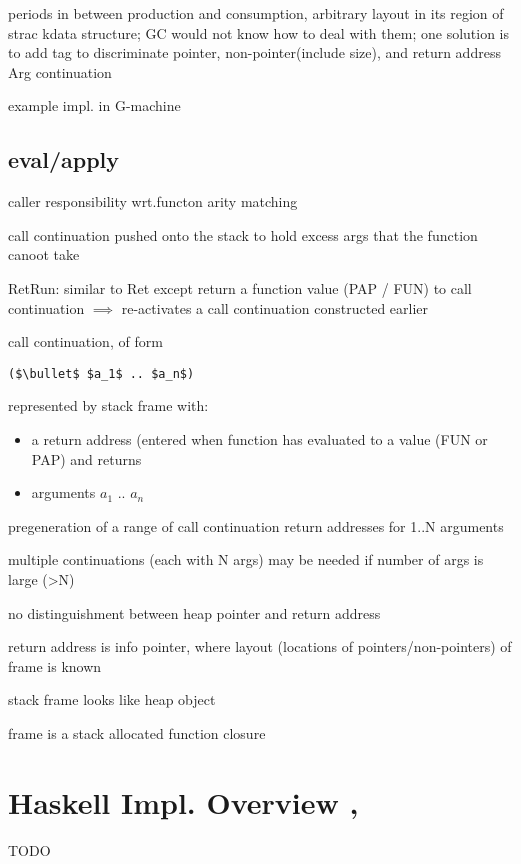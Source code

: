 \documentclass[8pt]{extarticle}
\begin{document}
\begin{multicols*}{2}
periods in between production and consumption, arbitrary layout in its region of strac kdata structure; GC would not know how to deal with them; one solution is to add tag to discriminate pointer, non-pointer(include size), and return address Arg continuation

example impl. in G-machine

\subsection{eval/apply}

caller responsibility wrt.functon arity matching

call continuation pushed onto the stack to hold excess args that the function canoot take

RetRun: similar to Ret except return a function value (PAP / FUN) to call continuation $\implies$ re-activates a call continuation constructed earlier

call continuation, of form
\begin{lstlisting}
($\bullet$ $a_1$ .. $a_n$)
\end{lstlisting}
represented by stack frame with:
\begin{itemize}
\item a return address (entered when function has evaluated to a value (FUN or PAP) and returns
\item arguments $a_1$ .. $a_n$
\end{itemize}

pregeneration of a range of call continuation return addresses for 1..N arguments

multiple continuations (each with N args)  may be needed if number of args is large (>N)

no distinguishment between heap pointer and return address

return address is info pointer, where layout (locations of pointers/non-pointers) of frame is known

stack frame looks like heap object

frame is a stack allocated function closure

\section{Haskell Impl. Overview \cite{wiki_STG}, \cite{terei2011}}

TODO



    
\end{multicols*}
\end{document}
